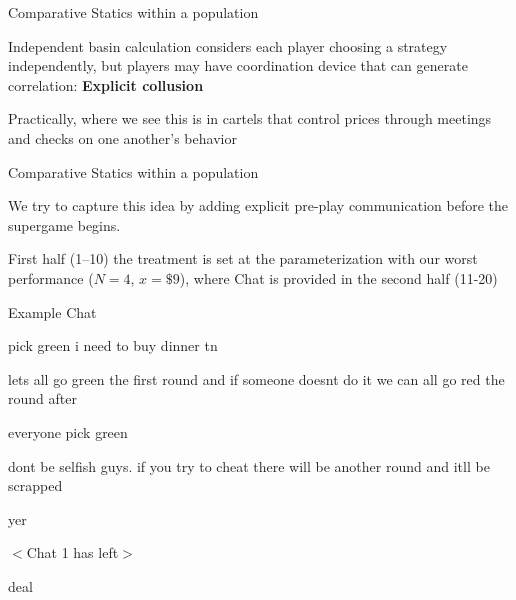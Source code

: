 \documentclass[english]{beamer}
\begin{document}
\begin{frame}{Comparative Statics within a population}
\begin{card}
  Independent basin calculation considers each player choosing a strategy independently, but players may have coordination device that can generate correlation: \textbf{Explicit collusion}
\end{card}
\begin{card}Practically, where we see this is in cartels that control prices through meetings and checks on one another's behavior
\end{card}
\end{frame}

\begin{frame}{Comparative Statics within a population}

\begin{card} 
We try to capture this idea by adding explicit pre-play communication before the supergame begins.
\end{card}

\begin{card} First half (1--10) the treatment is set at the parameterization with our worst performance ($N=4$, $x=\$9$), where  Chat is provided in the second half (11-20)
\end{card}
\end{frame}

\begin{frame}{Example Chat}
\begin{card}
    \begin{itemize}{\small 		
        \item[Chat 4:] pick green i need to buy dinner tn 		
        \item[Chat 3:] lets all go green the first round and if someone doesnt do it we can all go red the round after 		
        \item[Chat 1:] everyone pick green 		
        \item[Chat 2:] dont be selfish guys. if you try to cheat there will be another round and itll be scrapped 		
        \item[Chat 4:] yer 		
        \item[Chat 1:] $<$Chat 1 has left$>$ 		
        \item[Chat 2:] deal 		 }
    \end{itemize}
\end{card}
\end{frame}
\end{document}
